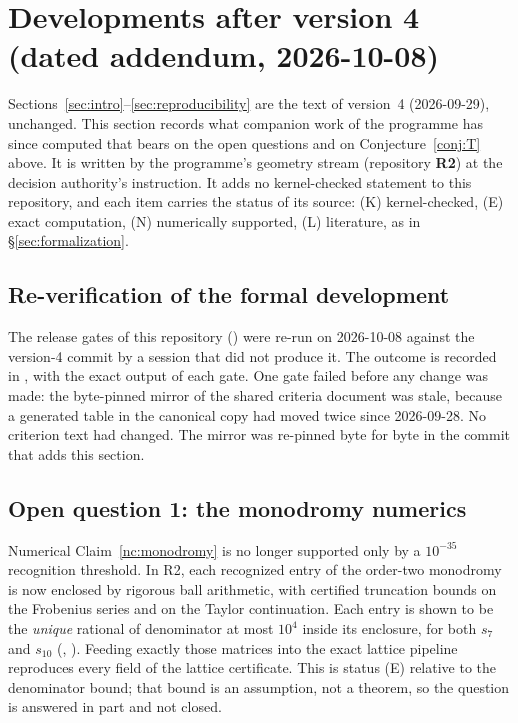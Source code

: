 \section{Developments after version 4 (dated addendum, 2026-10-08)}\label{sec:addendum}

Sections~\ref{sec:intro}--\ref{sec:reproducibility} are the text of version~4 (2026-09-29), unchanged. This
section records what companion work of the programme has since computed that bears on the open questions and
on Conjecture~\ref{conj:T} above. It is written by the programme's geometry stream (repository \textbf{R2})
at the decision authority's instruction. It adds no kernel-checked statement to this repository, and each item
carries the status of its source: (K) kernel-checked, (E) exact computation, (N) numerically supported, (L)
literature, as in \S\ref{sec:formalization}.

\subsection{Re-verification of the formal development}
The release gates of this repository () were re-run on 2026-10-08 against the
version-4 commit by a session that did not produce it. The outcome is recorded in
, with the exact output of each gate. One gate failed
before any change was made: the byte-pinned mirror of the shared criteria document was stale, because a
generated table in the canonical copy had moved twice since 2026-09-28. No criterion text had changed. The
mirror was re-pinned byte for byte in the commit that adds this section.

\subsection{Open question 1: the monodromy numerics}
Numerical Claim~\ref{nc:monodromy} is no longer supported only by a $10^{-35}$ recognition threshold. In R2,
each recognized entry of the order-two monodromy is now enclosed by rigorous ball arithmetic, with certified
truncation bounds on the Frobenius series and on the Taylor continuation. Each entry is shown to be the
\emph{unique} rational of denominator at most $10^4$ inside its enclosure, for both $s_7$ and $s_{10}$
(, ). Feeding exactly those matrices
into the exact lattice pipeline reproduces every field of the lattice certificate. This is status (E) relative
to the denominator bound; that bound is an assumption, not a theorem, so the question is answered in part and
not closed.

